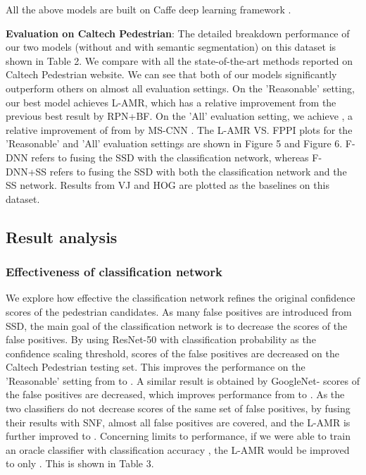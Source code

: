 \documentclass[10pt,letterpaper]{article}
\begin{document}
All the above models are built on Caffe deep learning framework \cite{caffe}.

\textbf{Evaluation on Caltech Pedestrian}: The detailed breakdown performance of our two models (without and with semantic segmentation) on this dataset is shown in Table 2. We compare with all the state-of-the-art methods reported on Caltech Pedestrian website. We can see that both of our models significantly outperform others on almost all evaluation settings. On the 'Reasonable' setting, our best model achieves  L-AMR, which has a  relative improvement from the previous best result  by RPN+BF. On the 'All' evaluation setting, we achieve , a relative improvement of  from  by MS-CNN \cite{mscnn}. The L-AMR VS. FPPI plots for the 'Reasonable' and 'All' evaluation settings are shown in Figure 5 and Figure 6. F-DNN refers to fusing the SSD with the classification network, whereas F-DNN+SS refers to fusing the SSD with both the classification network and the SS network. Results from VJ \cite{Viola} and HOG \cite{HOG} are plotted as the baselines on this dataset.

\subsection{Result analysis}

\subsubsection{Effectiveness of classification network}
We explore how effective the classification network refines the original confidence scores of the pedestrian candidates. As many false positives are introduced from SSD, the main goal of the classification network is to decrease the scores of the false positives. By using ResNet-50 with classification probability  as the confidence scaling threshold,  scores of the false positives are decreased on the Caltech Pedestrian testing set. This improves the performance on the 'Reasonable' setting from  to . A similar result is obtained by GoogleNet- scores of the false positives are decreased, which improves performance from  to . As the two classifiers do not decrease scores of the same set of false positives, by fusing their results with SNF, almost all false positives are covered, and the L-AMR is further improved to . Concerning limits to performance, if we were able to train an oracle classifier with classification accuracy , the L-AMR would be improved to only . This is shown in Table 3.
\end{document}
